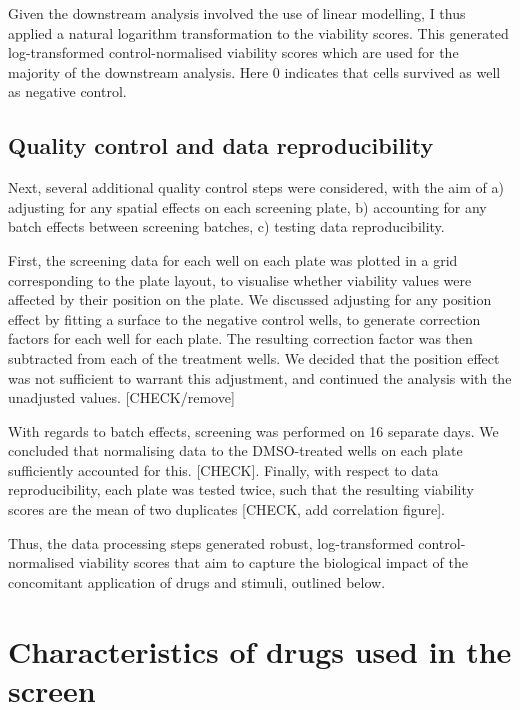 \documentclass[11pt, a4paper, twosided]{book}
\begin{document}
Given the downstream analysis involved the use of linear modelling, I thus applied a natural logarithm transformation to the viability scores. This generated log-transformed control-normalised viability scores which are used for the majority of the downstream analysis. Here 0 indicates that cells survived as well as negative control.

\hypertarget{quality-control-and-data-reproducibility}{%
\subsection{Quality control and data reproducibility}\label{quality-control-and-data-reproducibility}}

Next, several additional quality control steps were considered, with the aim of a) adjusting for any spatial effects on each screening plate, b) accounting for any batch effects between screening batches, c) testing data reproducibility.

First, the screening data for each well on each plate was plotted in a grid corresponding to the plate layout, to visualise whether viability values were affected by their position on the plate. We discussed adjusting for any position effect by fitting a surface to the negative control wells, to generate correction factors for each well for each plate. The resulting correction factor was then subtracted from each of the treatment wells. We decided that the position effect was not sufficient to warrant this adjustment, and continued the analysis with the unadjusted values. {[}CHECK/remove{]}

With regards to batch effects, screening was performed on 16 separate days. We concluded that normalising data to the DMSO-treated wells on each plate sufficiently accounted for this. {[}CHECK{]}. Finally, with respect to data reproducibility, each plate was tested twice, such that the resulting viability scores are the mean of two duplicates {[}CHECK, add correlation figure{]}.

Thus, the data processing steps generated robust, log-transformed control-normalised viability scores that aim to capture the biological impact of the concomitant application of drugs and stimuli, outlined below.

\hypertarget{drugs}{%
\section{Characteristics of drugs used in the screen}\label{drugs}}
\end{document}
